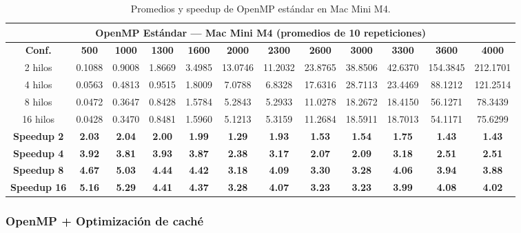 \documentclass{article}
\begin{document}
\begin{table}[H]
\centering
\tiny
\begin{tabular}{|c|c|c|c|c|c|c|c|c|c|c|c|}
\hline
\multicolumn{12}{|c|}{\textbf{OpenMP Estándar --- Mac Mini M4 (promedios de 10 repeticiones)}} \\
\hline
\textbf{Conf.} & \textbf{500} & \textbf{1000} & \textbf{1300} & \textbf{1600} & \textbf{2000} & \textbf{2300} & \textbf{2600} & \textbf{3000} & \textbf{3300} & \textbf{3600} & \textbf{4000} \\
\hline
2 hilos & 0.1088 & 0.9008 & 1.8669 & 3.4985 & 13.0746 & 11.2032 & 23.8765 & 38.8506 & 42.6370 & 154.3845 & 212.1701 \\
4 hilos & 0.0563 & 0.4813 & 0.9515 & 1.8009 & 7.0788 & 6.8328 & 17.6316 & 28.7113 & 23.4469 & 88.1212 & 121.2514 \\
8 hilos & 0.0472 & 0.3647 & 0.8428 & 1.5784 & 5.2843 & 5.2933 & 11.0278 & 18.2672 & 18.4150 & 56.1271 & 78.3439 \\
16 hilos & 0.0428 & 0.3470 & 0.8481 & 1.5960 & 5.1213 & 5.3159 & 11.2684 & 18.5911 & 18.7013 & 54.1171 & 75.6299 \\
\hline
\textbf{Speedup 2} & \textbf{2.03} & \textbf{2.04} & \textbf{2.00} & \textbf{1.99} & \textbf{1.29} & \textbf{1.93} & \textbf{1.53} & \textbf{1.54} & \textbf{1.75} & \textbf{1.43} & \textbf{1.43} \\
\textbf{Speedup 4} & \textbf{3.92} & \textbf{3.81} & \textbf{3.93} & \textbf{3.87} & \textbf{2.38} & \textbf{3.17} & \textbf{2.07} & \textbf{2.09} & \textbf{3.18} & \textbf{2.51} & \textbf{2.51} \\
\textbf{Speedup 8} & \textbf{4.67} & \textbf{5.03} & \textbf{4.44} & \textbf{4.42} & \textbf{3.18} & \textbf{4.09} & \textbf{3.30} & \textbf{3.28} & \textbf{4.06} & \textbf{3.94} & \textbf{3.88} \\
\textbf{Speedup 16} & \textbf{5.16} & \textbf{5.29} & \textbf{4.41} & \textbf{4.37} & \textbf{3.28} & \textbf{4.07} & \textbf{3.23} & \textbf{3.23} & \textbf{3.99} & \textbf{4.08} & \textbf{4.02} \\
\hline
\end{tabular}
\caption{Promedios y speedup de OpenMP estándar en Mac Mini M4.}
\label{tab:omp_mac}
\end{table}

\subsubsection{OpenMP + Optimización de caché}
\end{document}
